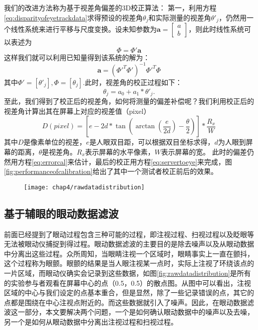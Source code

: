 我们的改进方法称为基于视差角偏差的3D校正算法：
第一，利用方程\ref{eq:disparityofeyetrackdata}求得预设的视差角$\theta_j$和实际测量的视差角$\theta'_j$，仍然用一个线性系统来进行平移与尺度变换。设未知参数为$\textbf{a} = \left[ \begin{array}{l}
a\\
b
\end{array} \right]$，则此时线性系统可以表述为
\begin{equation}
\Phi  = \Phi '\textbf{a}
\end{equation}
这样我们就可以利用已知量得到该系统的解为：
\begin{equation}
\textbf{a} = {({\Phi'^T}\Phi')^{-1}}{\Phi'^T}\Phi
\end{equation}
其中$\Phi'=[\theta'_j],\Phi=[\theta_j]$.此时，视差角的校正过程如下：
\begin{equation}
\label{eq:3dcalibrationangular}
{\theta_j} = {a_0} + {a_1}*{\theta'_j}.
\end{equation}
至此，我们得到了校正后的视差角，如何将测量的偏差补偿呢？我们利用校正后的视差角计算出其在屏幕上对应的视差值（pixel）
\begin{equation}
\label{disparityfromangulartopixel}
D(pixel) = \left[ {e - 2d*\tan (\arctan (\frac{e}{{2d}}) - \frac{\theta }{2})} \right]*\frac{{{R_x}}}{W}
\end{equation}
其中$D$是像素单位的视差，$e$是人眼双目距，可以根据双目坐标求得，$d$为人眼到屏幕的距离，$\theta$是视差角。$R_x$表示屏幕的水平像素，$W$表示屏幕的宽。
此时的偏差仍然用方程\ref{eq:errorcal}来估计，最后的校正用方程\ref{eq:servertoeye}来完成，图\ref{fig:performanceofcalibration}给出了其中一个测试者校正前后的效果。
\begin{figure}[t]
  \centering
  \texttt{[image: chap4/rawdatadistribution]}
\end{figure}
\subsection{基于辅眼的眼动数据滤波}
\label{sec:filter}
前面已经提到了眼动过程包含三种可能的过程，即注视过程、扫视过程以及眨眼等无法被眼动仪捕捉到得过程。眼动数据滤波的主要目的是除去噪声以及从眼动数据中分离出这些过程。众所周知，当眼睛注视一个区域时，眼睛事实上一直在颤抖，这个过程称为眼颤。眼颤的结果是当人眼注视某一点时，实际上注视了环绕该点的一片区域，而眼动仪确实会记录到这些数据，如图\ref{fig:rawdatadistribution}是所有的实验参与者观看在屏幕中心的点（0.5，0.5）的散点图。从图中可以看出，注视区域的中心与我们设定的点基本重合，但是显然，除了一些记录错误的点，其它的点都是围绕在中心注视点附近的。而这些数据就引入了噪声。因此，在眼动数据滤波这一部分，本文要解决两个问题，一个是如何确认眼动数据中的噪声以及去噪，另一个是如何从眼动数据中分离出注视过程和扫视过程。

